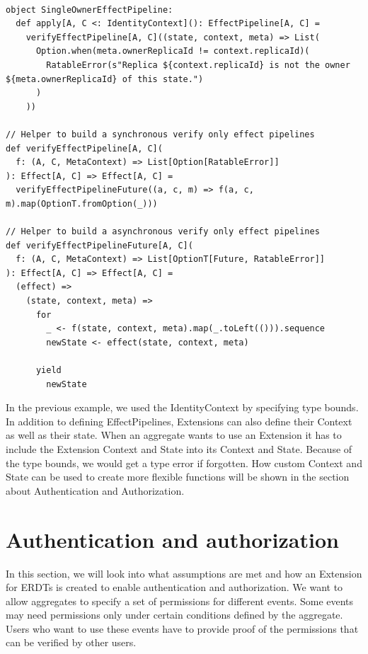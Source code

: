 \documentclass[
	ngerman,
	ruledheaders=section,   %
	class=report,		    %
	thesis={type=bachelor}, %
	accentcolor=9c,			%
	custommargins=true,    %
	marginpar=false,        %
	parskip=half-,          %
	fontsize=11pt,          %
]{tudapub}
\begin{document}
\begin{lstlisting}
  
object SingleOwnerEffectPipeline:
  def apply[A, C <: IdentityContext](): EffectPipeline[A, C] =
    verifyEffectPipeline[A, C]((state, context, meta) => List(
      Option.when(meta.ownerReplicaId != context.replicaId)(
        RatableError(s"Replica ${context.replicaId} is not the owner ${meta.ownerReplicaId} of this state.")
      )
    ))

// Helper to build a synchronous verify only effect pipelines
def verifyEffectPipeline[A, C](
  f: (A, C, MetaContext) => List[Option[RatableError]]
): Effect[A, C] => Effect[A, C] =
  verifyEffectPipelineFuture((a, c, m) => f(a, c, m).map(OptionT.fromOption(_)))
  
// Helper to build a asynchronous verify only effect pipelines
def verifyEffectPipelineFuture[A, C](
  f: (A, C, MetaContext) => List[OptionT[Future, RatableError]]
): Effect[A, C] => Effect[A, C] =
  (effect) =>
    (state, context, meta) => 
      for
        _ <- f(state, context, meta).map(_.toLeft(())).sequence
        newState <- effect(state, context, meta)

      yield
        newState

\end{lstlisting}

In the previous example, we used the IdentityContext by specifying type bounds. In addition to defining EffectPipelines, Extensions can also define their Context as well as their state. When an aggregate wants to use an Extension it has to include the Extension Context and State into its Context and State. Because of the type bounds, we would get a type error if forgotten. How custom Context and State can be used to create more flexible functions will be shown in the section about Authentication and Authorization.

\section{Authentication and authorization}
In this section, we will look into what assumptions are met and how an Extension for ERDTs is created to enable authentication and authorization. We want to allow aggregates to specify a set of permissions for different events. Some events may need permissions only under certain conditions defined by the aggregate. Users who want to use these events have to provide proof of the permissions that can be verified by other users.
\end{document}
